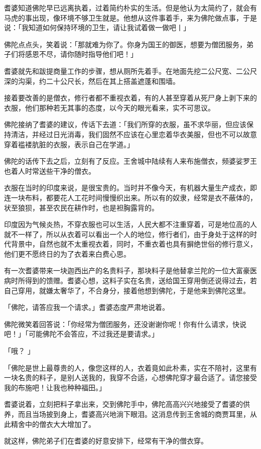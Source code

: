 \documentclass[12pt,twoside,openany]{book}
\begin{document}
耆婆知道佛陀早已远离执着，过着简约朴实的生活。但是他认为太简约了，就会有马虎的事出现，像环境不够卫生就是。他想从这件事着手，来为佛陀做点事，于是说：「我知道如何保持环境的卫生，请让我试着做一做吧丨」

佛陀点点头，笑着说：「那就难为你了。你身为国王的御医，想要为僧团服务，弟子们将感恩不尽，请你随时指导他们吧！」

耆婆就先和跋提商量工作的步骤，想从厕所先着手。在地面先挖二公尺宽、二公尺深的沟渠，约二十公尺长，然后在其上搭盖遮蓬和围墙。

接着要改善的是僧衣，修行者都不重视衣着，有的人甚至穿着从死尸身上剥下来的衣服，他们那种若无其事的态度，以今天的眼光看来，实不可思议。

佛陀接纳了耆婆的建议，传话下去道：「我们所穿的衣服，虽不求华丽，但应该保持清洁，并经过日光消毒，我们固然不应该在心里恋着华衣美服，但也不可以故意穿着褴褛肮脏的衣服，表示自己在学道。」

佛陀的话传下去之后，立刻有了反应。王舍城中陆续有人来布施僧衣，频婆娑罗王也着人时常送些干净的僧衣。

衣服在当时的印度来说，是很宝贵的。当时并不像今天，有机器大量生产成衣，即连一块布料，都要花人工花时间慢慢织出来。所以有的奴隶，经常是衣不蔽体的，状至狼狈，甚至农民在耕作时，也是袒胸露背的。

印度因为气候炎热，不穿衣服也可以生活，人民大都不注重穿着，可是地位高的人就不一样了，所以从衣着可以看出一个人的地位，修行者们，由于身处于这样的时代背景中，自然也就不太重视衣着，同时，不重衣着也具有摒绝世俗的修行意义，他们更不愿终日的为了衣着来白费心思。

有一次耆婆带来一块迦西出产的名贵料子，那块料子是他替拿兰陀的一位大富豪医病时所得到的馈赠。耆婆心想，这料子实在名贵，送给国王穿用倒还说得过去，若自己穿用，就嫌太奢华了，不合身分，接着他想到佛陀，于是他来到佛陀这里。

「佛陀，请答应我一个请求。」耆婆态度严肃地说着。

佛陀微笑着回答说：「你经常为僧团服务，还没谢谢你呢！你有什么请求，快说吧！」「可能佛陀不会答应，不过我还是要请求。」

「哦？	」

「佛陀是世上最尊贵的人，像您这样的人，衣着竟如此朴素，实在不陪衬，这里有一块名贵的料子，是别人送我的，我穿不合适，心想佛陀穿才最合适了。请您接受我的布施吧！让我也种种福田。」

耆婆说着，立刻把料子拿出来，交到佛陀手中，佛陀高高兴兴地接受了耆婆的供养，而且当场披到身上，耆婆高兴地淌下眼泪。这消息传到王舍城的商贾耳里，从此精舍中的僧衣大大增加了。

就这样，佛陀弟子们在耆婆的好意安排下，经常有干净的僧衣穿。
\end{document}
